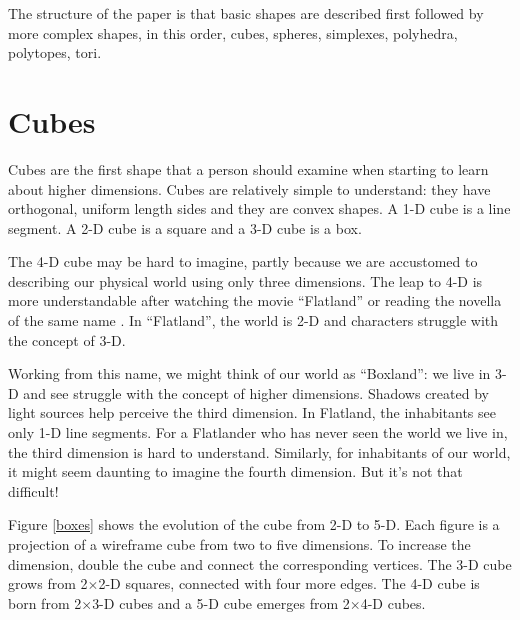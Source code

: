 The structure of the paper is that basic shapes are described first
followed by more complex shapes, in this order,
cubes, spheres, simplexes, polyhedra, polytopes, tori.







\section{Cubes}


Cubes are the first shape that a person should examine when
starting to learn about higher dimensions. Cubes are relatively simple
to understand: they have orthogonal, uniform length sides and they are
convex shapes. A 1-D cube is a line segment. A 2-D cube is a square and
a 3-D cube is a box.

The 4-D cube may be hard to imagine, partly because we are accustomed
to describing our physical world using only three dimensions.  The
leap to 4-D is more understandable after watching the movie
``Flatland'' \citep{Ma65} or reading the novella of the same name
\citep{Ab1884}. In ``Flatland'', the world is 2-D and characters struggle
with the concept of 3-D.

Working from this name, we might think of our world as ``Boxland'': we live in 3-D and see
struggle with the concept of higher dimensions. Shadows created by light sources help
perceive the third dimension. In Flatland, the inhabitants see only
1-D line segments. For a Flatlander who has never seen the world we
live in, the third dimension is hard to understand. Similarly,
for inhabitants of our world, it might seem daunting to imagine the
fourth dimension. But it's not that difficult!

Figure \ref{boxes} shows the evolution of the cube from 2-D to
5-D. Each figure is a projection of a wireframe cube from two to five
dimensions. To increase the dimension, double the cube and connect the
corresponding vertices. The 3-D cube grows from 2$\times$2-D squares,
connected with four more edges. The 4-D cube is born from 2$\times$3-D
cubes and a 5-D cube emerges from 2$\times$4-D cubes.

